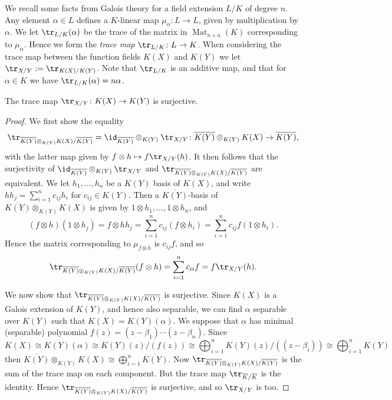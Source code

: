 We recall some facts from Galois theory for a field extension $L/K$ of degree $n$.
Any element $\alpha \in L$ defines a $K$-linear map $\mu_{\alpha} \colon  L \rightarrow L$, given by multiplication by $\alpha$.
We let $\tr_{L/K}(\alpha)$ be the trace of the matrix in $\operatorname{Mat}_{n \times n}(K)$ corresponding to $\mu_\alpha$.
Hence we form the {\em trace map} $\tr_{L/K}\colon L \ra K$.
When considering the trace map between the function fields $K(X)$ and $K(Y)$ we let $\tr_{X/Y} := \tr_{K(X)/K(Y)}$.
Note that $\tr_{L/K}$ is an additive map, and that for $\alpha \in K$ we have $\tr_{L/K}(\alpha) = n \alpha$.
    \begin{prop}\label{proptracelemmasurjective}
    The trace map $\tr_{X/Y} \colon K(X) \ra K(Y)$ is surjective.
    \end{prop}
    \begin{proof}
    We first show the equality 
        \[
        \tr_{\overline{K(Y)}\otimes_{K(Y)}K(X)/\overline{K(Y)}} = \id_{\overline{K(Y)}}\otimes _{K(Y)} \tr_{X/Y} \colon \overline{K(Y)}\otimes_{K(Y)}K(X) \ra \overline{K(Y)},
        \]
    with the latter map given by $f\otimes h \mapsto f\tr_{X/Y}(h)$.
    It then follows that the surjectivity of $\id_{\overline{K(Y)}}\otimes _{K(Y)} \tr_{X/Y}$ and $\tr_{\overline{K(Y)}\otimes_{K(Y)}K(X)/\overline{K(Y)}}$ are equivalent.
    We let $h_1, \ldots, h_n$ be a $K(Y)$ basis of $K(X)$, and write $hh_j = \sum_{i=1}^n c_{ij}h_i$ for $c_{ij} \in K(Y)$.
    Then a $\overline{K(Y)}$-basis of $\overline{K(Y)}\otimes_{K(Y)}K(X)$ is given by $1 \otimes h_1, \ldots, 1 \otimes h_n$, and 
        \[
        (f \otimes h)(1\otimes h_j) = f \otimes hh_j = \sum_{i=1}^n c_{ij}(f \otimes h_i) = \sum_{i=1}^n c_{ij}f(1 \otimes h_i).
        \]  
    Hence the matrix corresponding to $\mu_{f \otimes h}$ is $c_{ij}f$, and so
        \[
        \tr_{\overline{K(Y)}\otimes_{K(Y)}K(X)/\overline{K(Y)}}(f \otimes h) = \sum_{i=1}^n c_{ii}f = f \tr_{X/Y}(h).
        \]  

    We now show that $\tr_{\overline{K(Y)}\otimes_{K(Y)}K(X)/\overline{K(Y)}}$ is surjective.
    Since $K(X)$ is a Galois extension of $K(Y)$, and hence also separable, we can find $\alpha$ separable over $K(Y)$ such that $K(X) = K(Y)(\alpha)$.
    We suppose that $\alpha$ has minimal (separable) polynomial $f(z) = (z - \beta_1)\cdots (z - \beta_n)$.
    Since
        \[
        K(X) \cong K(Y)(\alpha) \cong K(Y)(z)/(f(z)) \cong \bigoplus_{i=1}^n K(Y)(z)/((z-\beta_i)) \cong \bigoplus_{i=1}^n K(Y)
        \]  
    then $\overline{K(Y)}\otimes_{K(Y)} K(X) \cong \bigoplus_{i=1}^n \overline{K(Y)}$.
    Now $\tr_{\overline{K(Y)}\otimes_{K(Y)}K(X)/\overline{K(Y)}}$ is the sum of the trace map on each component.
    But the trace map $\tr_{\overline{K}/\overline{K}}$ is the identity.
    Hence $\tr_{\overline{K(Y)}\otimes_{K(Y)}K(X)/\overline{K(Y)}}$ is surjective, and so $\tr_{X/Y}$ is too.
    \end{proof}

